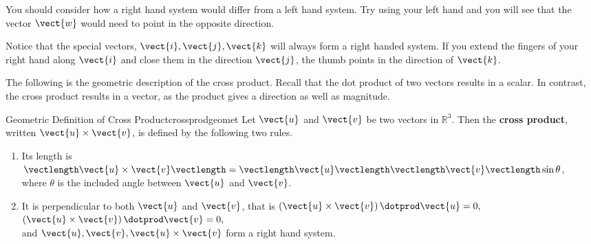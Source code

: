 You should consider how a right hand
system would differ from a left hand system. Try using your left hand and
you will see that the vector $\vect{w}$ would need to point in the
opposite direction.

Notice that the special vectors, $\vect{i},\vect{j},\vect{k}$ will always form a right handed
system. If you extend the fingers of your right hand along $\vect{i}$ and 
close them in the direction $\vect{j}$, the thumb points
in the direction of $\vect{k}$.

\begin{center}
\end{center}

The following is the geometric description of the cross product. Recall that the dot product of 
two vectors results in a scalar. In contrast, the cross product results in a vector, as the product gives
a direction as well as magnitude.

\begin{definition}{Geometric Definition of Cross Product}{crossprodgeomet}
Let $\vect{u}$ and $\vect{v}$ be two vectors in $\mathbb{R}^{3}.$ 
Then the \textbf{cross product}, written $\vect{u}\times \vect{v}$, is defined by
 the following two rules.

\begin{enumerate}
\item Its length is $\vectlength \vect{u}\times \vect{v}\vectlength =\vectlength \vect{u}\vectlength \vectlength
\vect{v}\vectlength \sin \theta $, \\
where $\theta $ is the included angle between $\vect{u}$ and $\vect{v}$.

\item It is perpendicular to both $\vect{u}$ and $\vect{v}$, that is $\left( \vect{u}\times \vect{v} \right) \dotprod \vect{u}=0,$ $\left( \vect{u}\times \vect{v} \right) \dotprod \vect{v}=0,$ \\
and  $\vect{u},\vect{v},\vect{u}\times \vect{v}$ form a right hand system.
\end{enumerate}
\end{definition}

